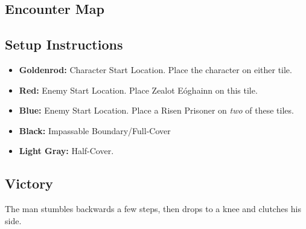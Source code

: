 \subsection*{Encounter Map}
\begin{center}
\end{center}

\subsection*{Setup Instructions}
\begin{itemize}
\item \textbf{Goldenrod:} Character Start Location. Place the character on either tile.
\item \textbf{Red:} Enemy Start Location. Place Zealot Eóghainn on this tile.
\item \textbf{Blue:} Enemy Start Location. Place a Risen Prisoner on \emph{two} of these tiles.
\item \textbf{Black:} Impassable Boundary/Full-Cover
\item \textbf{Light Gray:} Half-Cover.
\end{itemize}

\pagebreak

\subsection*{Victory}
The man stumbles backwards a few steps, then drops to a knee and clutches his side.\\

